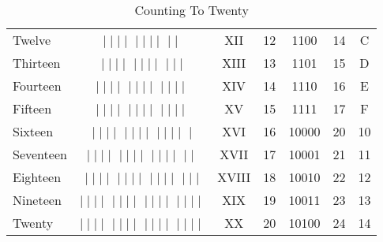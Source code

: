 \begin{table}[H]
\begin{center}
\begin{tabular}{lcccccc}
      Twelve    & \sout{$\mid\mid\mid\mid$}
      \sout{$\mid\mid\mid\mid$}
      $\mid\mid$                                & XII   & 12 & 1100  & 14 & C \\ 
      Thirteen  & \sout{$\mid\mid\mid\mid$}
      \sout{$\mid\mid\mid\mid$}
      $\mid\mid\mid$                            & XIII  & 13 & 1101  & 15 & D \\ 
      Fourteen  & \sout{$\mid\mid\mid\mid$}
      \sout{$\mid\mid\mid\mid$}
      $\mid\mid\mid\mid$                        & XIV   & 14 & 1110  & 16 & E \\ 
      Fifteen   & \sout{$\mid\mid\mid\mid$}
      \sout{$\mid\mid\mid\mid$}
      \sout{$\mid\mid\mid\mid$}             & XV    & 15 & 1111  & 17 & F \\ 
      Sixteen   & \sout{$\mid\mid\mid\mid$}
      \sout{$\mid\mid\mid\mid$}
      \sout{$\mid\mid\mid\mid$}
      $\mid$                                    & XVI   & 16 & 10000 & 20 & 10 \\ 
      Seventeen & \sout{$\mid\mid\mid\mid$}
      \sout{$\mid\mid\mid\mid$}
      \sout{$\mid\mid\mid\mid$}
      $\mid\mid$                                & XVII  & 17 & 10001 & 21 & 11 \\ 
      Eighteen  & \sout{$\mid\mid\mid\mid$}
      \sout{$\mid\mid\mid\mid$}
      \sout{$\mid\mid\mid\mid$}
      $\mid\mid\mid$                            & XVIII & 18 & 10010 & 22 & 12 \\ 
      Nineteen  & \sout{$\mid\mid\mid\mid$}
      \sout{$\mid\mid\mid\mid$}
      \sout{$\mid\mid\mid\mid$}
      $\mid\mid\mid\mid$                        & XIX   & 19 & 10011 & 23 & 13 \\ 
      Twenty    & \sout{$\mid\mid\mid\mid$}
      \sout{$\mid\mid\mid\mid$}
      \sout{$\mid\mid\mid\mid$}
      \sout{$\mid\mid\mid\mid$}             & XX    & 20 & 10100 & 24 & 14 \\ 
      \hline
    \end{tabular} 
  \end{center}
  \caption{Counting To Twenty}
  \label{MF:tab:counting_to_twenty}
\end{table}

